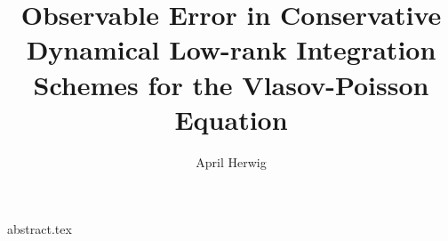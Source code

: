\documentclass[a4paper]{article}
\title{
    Observable Error in Conservative 
    Dynamical Low-rank Integration Schemes 
    for the Vlasov-Poisson Equation
}
\author{April Herwig}
\begin{document}
\maketitle

{abstract.tex}

\tableofcontents


\end{document}
